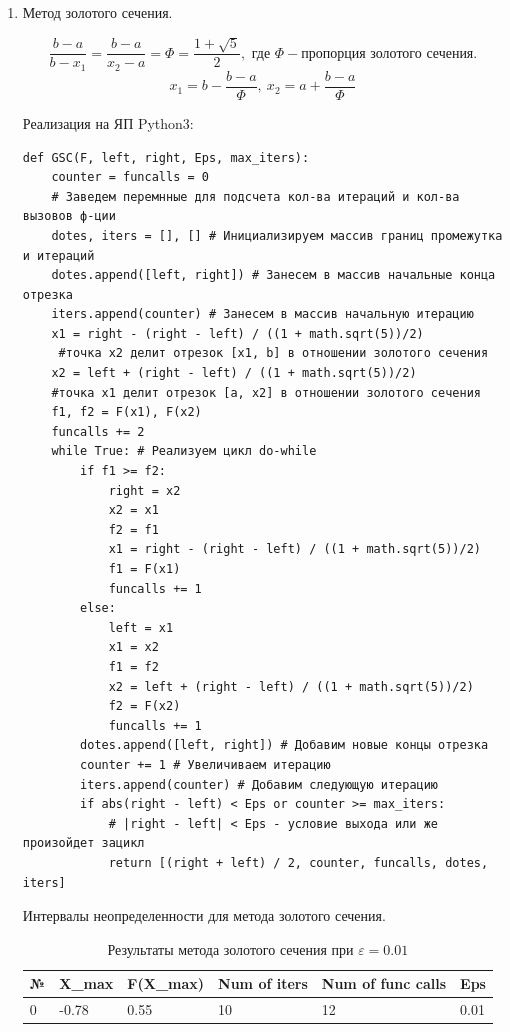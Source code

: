 \documentclass[10pt]{article}
\begin{document}
\begin{enumerate}
\item
\begin{center}
\begin{large}
Метод золотого сечения.\\
\end{large}
\[\frac{b - a}{b - x_1} = \frac{b - a}{x_2 - a} = \Phi = \frac{1 + \sqrt{5}}{2}, \text{ где } \Phi - \text{пропорция золотого сечения.}\]
\[x_1 = b - \frac{b - a}{\Phi},\ x_2 = a + \frac{b - a}{\Phi}\]
\end{center}
\begin{center}
Реализация на ЯП Python3:\\
\end{center}
\begin{verbatim}
def GSC(F, left, right, Eps, max_iters):
    counter = funcalls = 0 
    # Заведем перемнные для подсчета кол-ва итераций и кол-ва вызовов ф-ции
    dotes, iters = [], [] # Инициализируем массив границ промежутка и итераций
    dotes.append([left, right]) # Занесем в массив начальные конца отрезка
    iters.append(counter) # Занесем в массив начальную итерацию
    x1 = right - (right - left) / ((1 + math.sqrt(5))/2)
     #точка x2 делит отрезок [x1, b] в отношении золотого сечения
    x2 = left + (right - left) / ((1 + math.sqrt(5))/2) 
    #точка x1 делит отрезок [a, x2] в отношении золотого сечения
    f1, f2 = F(x1), F(x2)
    funcalls += 2
    while True: # Реализуем цикл do-while
        if f1 >= f2: 
            right = x2
            x2 = x1
            f2 = f1
            x1 = right - (right - left) / ((1 + math.sqrt(5))/2)
            f1 = F(x1)
            funcalls += 1
        else:
            left = x1
            x1 = x2
            f1 = f2
            x2 = left + (right - left) / ((1 + math.sqrt(5))/2)
            f2 = F(x2)
            funcalls += 1
        dotes.append([left, right]) # Добавим новые концы отрезка
        counter += 1 # Увеличиваем итерацию
        iters.append(counter) # Добавим следующую итерацию
        if abs(right - left) < Eps or counter >= max_iters: 
            # |right - left| < Eps - условие выхода или же произойдет зацикл
            return [(right + left) / 2, counter, funcalls, dotes, iters]
\end{verbatim}
\newpage
\begin{center}
Интервалы неопределенности для метода золотого сечения.
\end{center}

\begin{table}[H]
\caption{Результаты метода золотого сечения при $\varepsilon = 0.01$}
\begin{center}
\begin{tabular}{|l|l|l|l|l|l|}
\hline
№ & X\_max    & F(X\_max) & Num of iters & Num of func calls & Eps  \\
\hline
    0 & -0.78  &   0.55 &               10 &                   12 &
0.01 \\
\hline
\end{tabular}
\end{center}
\end{table}


\end{enumerate}
\end{document}
